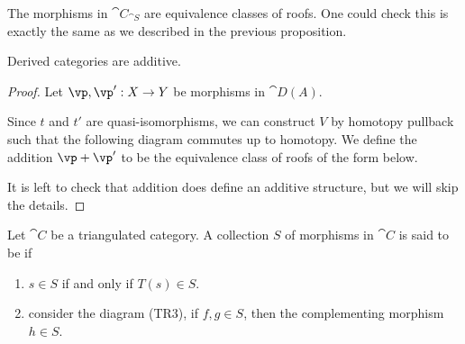 The morphisms in ${\cat{C}}_{\cat{S}}$ are equivalence classes of roofs. One could check this is exactly the same as we described in the previous proposition.
\begin{proposition}
    Derived categories are additive.
\end{proposition}
\begin{proof}
    Let $\vp,\vp':X\to Y$ be morphisms in $\cat{D(A)}$. 
    \begin{center}
        \hspace{2.5cm}
    \end{center}
    Since $t$ and $t'$ are quasi-isomorphisms, we can construct $V$ by homotopy pullback such that the following diagram commutes up to homotopy. We define the addition $\vp+\vp'$ to be the equivalence class of roofs of the form below.
    \begin{center}
        \hspace{2.5cm}
    \end{center}
    It is left to check that addition does define an additive structure, but we will skip the details.
\end{proof}
\begin{definition}
    Let $\cat{C}$ be a triangulated category. A collection $S$ of morphisms in $\cat{C}$ is said to be  if 
    \begin{enumerate}
        \item $s\in S$ if and only if $T(s)\in S$.
        \item consider the diagram (TR3), if $f,g\in S$, then the complementing morphism $h\in S$.
    \end{enumerate}
\end{definition}

